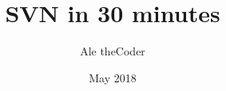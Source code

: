 %

%

%
\graphicspath{{graphics/}}
%
%
%
\title{SVN in 30 minutes}                                                %
\author{Ale theCoder}                                                    %
\date{May 2018}                                                         %
%
%
%
%

%

%
%
\maketitle
%

%
%
%









%
